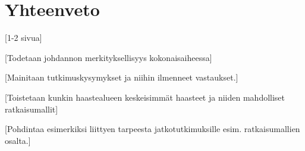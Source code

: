 \chapter{Yhteenveto\label{conclusions}}

[1-2 sivua]

[Todetaan johdannon merkityksellisyys kokonaisaiheessa]

[Mainitaan tutkimuskysymykset ja niihin ilmenneet vastaukset.]

[Toistetaan kunkin haastealueen keskeisimmät haasteet ja niiden mahdolliset ratkaisumallit]

[Pohdintaa esimerkiksi liittyen tarpeesta jatkotutkimuksille esim. ratkaisumallien osalta.]
